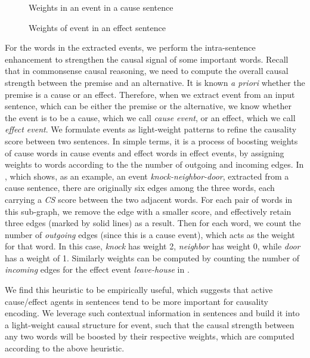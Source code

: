 \begin{figure}[th]
\centering
{}
\caption{Weights in an event in a cause sentence}
\label{fig:causeEvent}
\end{figure}

\begin{figure}[th]
\centering
{}
\caption{Weights of event in an effect sentence}
\label{fig:effectEvent}
\end{figure}

For the words in the extracted events, we perform the intra-sentence
enhancement to strengthen the causal signal of some important words.
Recall that in commonsense causal reasoning, we need to compute the
overall causal strength between the premise and an alternative. It
is known {\em a priori} whether the premise is a cause or an effect.
Therefore, when we extract event from an input sentence, which can
be either the premise or the alternative, we know whether the event
is to be a cause, which we call {\em cause event}, or an effect,
which we call {\em effect event}. We formulate events as
light-weight patterns to refine the causality score between two
sentences. In simple terms, it is a process of boosting weights of
cause words in cause events and effect words in effect events, by
assigning weights to words according to the the number of outgoing
and incoming edges. In , which shows, as
an example, an event {\em knock-neighbor-door},
extracted from a cause sentence, there are
originally six edges among the three words, each carrying a \emph{CS}
score between the two adjacent words. For each pair of words in this
sub-graph, we remove the edge with a smaller score, and effectively
retain three edges (marked by solid lines) as a result. Then for
each word, we count the number of {\em outgoing} edges (since this
is a cause event), which acts as the weight for that word. In this
case, {\em knock} has weight 2, {\em neighbor} has weight 0, while
{\em door} has a weight of 1. Similarly weights can be computed by
counting the number of {\em incoming} edges for the effect event
{\em leave-house} in .

We find this heuristic to be empirically useful, which
suggests that active cause/effect agents in sentences tend to be
more important for causality encoding. We leverage such contextual
information in sentences and build it into a light-weight causal
structure for event, such that the causal strength between any two
words will be boosted by their respective weights, which are computed
according to the above heuristic.

